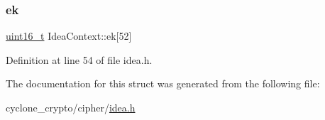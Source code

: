 \mbox{\label{structIdeaContext_a5537bf543ce4153716021512e203e628}} 
\subsubsection{\texorpdfstring{ek}{ek}}
{\footnotesize\ttfamily \hyperlink{stdint_8h_a273cf69d639a59973b6019625df33e30}{uint16\+\_\+t} Idea\+Context\+::ek\mbox{[}52\mbox{]}}



Definition at line 54 of file idea.\+h.



The documentation for this struct was generated from the following file\+:\begin{DoxyCompactItemize}
\item 
cyclone\+\_\+crypto/cipher/\hyperlink{idea_8h}{idea.\+h}\end{DoxyCompactItemize}
